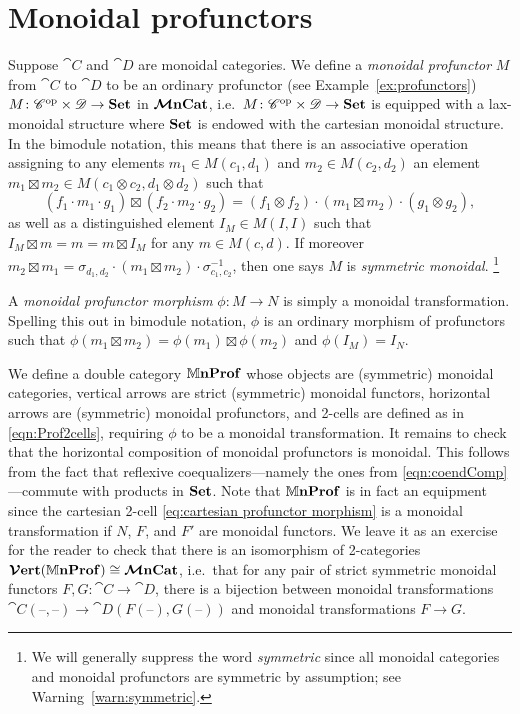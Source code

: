 \documentclass[11pt,oneside,article]{memoir}
\begin{document}
\section{Monoidal profunctors}
    \label{sec:monoidal_profunctors}

Suppose $\cat{C}$ and $\cat{D}$ are monoidal categories. We define a \emph{monoidal profunctor} $M$
from $\cat{C}$ to $\cat{D}$ to be an ordinary profunctor (see Example~\ref{ex:profunctors}) $M\colon
{\mathscr{C}}^{\text{op}}\times\mathscr{D}\to\mathbf{Set}$ in $\bm{\mathcal{M}}\mathbf{nCat}$, i.e.\ $M\colon {\mathscr{C}}^{\text{op}}\times\mathscr{D}\to\mathbf{Set}$ is
equipped with a lax-monoidal structure where $\mathbf{Set}$ is endowed with the cartesian monoidal
structure. In the bimodule notation, this means that there is an associative operation assigning to
any elements $m_1\in M(c_1,d_1)$ and $m_2\in M(c_2,d_2)$ an element $m_1\boxtimes m_2\in
M(c_1\otimes c_2,d_1\otimes d_2)$ such that
\[
   (f_1\cdot m_1\cdot g_1)\boxtimes(f_2\cdot m_2\cdot g_2)
      = (f_1\otimes f_2)\cdot(m_1\boxtimes m_2)\cdot(g_1\otimes g_2),
\]
as well as a distinguished element $I_M\in M(I,I)$ such that $I_M\boxtimes m = m = m\boxtimes I_M$
for any $m\in M(c,d)$. If moreover $m_2\boxtimes m_1 = \sigma_{d_1,d_2}\cdot(m_1\boxtimes
m_2)\cdot\sigma_{c_1,c_2}^{-1}$, then one says $M$ is \emph{symmetric monoidal}.%
\footnote{
  We will generally suppress the word \emph{symmetric} since all monoidal categories and monoidal
  profunctors are symmetric by assumption; see Warning~\ref{warn:symmetric}.
} 

A \emph{monoidal profunctor morphism} $\phi\colon M\to N$ is simply a monoidal transformation.
Spelling this out in bimodule notation, $\phi$ is an
ordinary morphism of profunctors such that $\phi(m_1\boxtimes m_2)=\phi(m_1)\boxtimes\phi(m_2)$ and
$\phi(I_M)=I_N$.

We define a double category $\mathbb{M}\mathbf{nProf}$ whose objects are (symmetric) monoidal categories, vertical
arrows are strict (symmetric) monoidal functors, horizontal arrows are (symmetric) monoidal
profunctors, and 2-cells are defined as in \eqref{eqn:Prof2cells}, requiring $\phi$ to be a monoidal
transformation. It remains to check that the horizontal composition of monoidal profunctors is
monoidal. This follows from the fact that reflexive coequalizers---namely the ones from
\eqref{eqn:coendComp}---commute with products in $\mathbf{Set}$. Note that $\mathbb{M}\mathbf{nProf}$ is in fact an
equipment since the cartesian 2-cell \eqref{eq:cartesian profunctor morphism} is a monoidal
transformation if $N$, $F$, and $F'$ are monoidal functors. We leave it as an exercise for the
reader to check that there is an isomorphism of 2-categories $\bm{\mathcal{V}}\mathbf{ert}(\mathbb{M}\mathbf{nProf})\cong\bm{\mathcal{M}}\mathbf{nCat}$, i.e.\
that for any pair of strict symmetric monoidal functors $F,G\colon\cat{C}\to\cat{D}$, there is a
bijection between monoidal transformations
$\cat{C}(\textrm{--},\textrm{--})\to\cat{D}(F(\textrm{--}),G(\textrm{--}))$ and monoidal
transformations $F\to G$.
\end{document}
